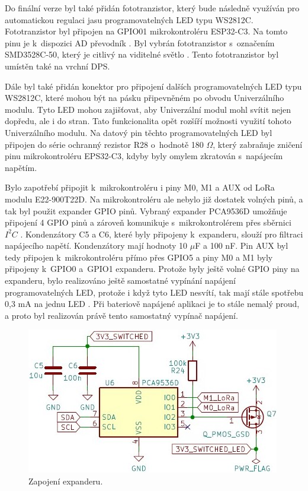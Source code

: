 Do finální verze byl také přidán fototranzistor, který bude následně využíván pro automatickou regulaci jasu programovatelných LED typu WS2812C. Fototranzistor byl připojen na GPIO01 mikrokontroléru ESP32-C3. Na tomto 
pinu je k~dispozici AD převodník \cite{ESP_C3_dtsh}. Byl vybrán fototranzistor s~označením SMD3528C-50, který je citlivý na viditelné světlo \cite{Phototransistor}.
Tento fototranzistor byl umístěn také na vrchní DPS. 

Dále byl také 
přidán konektor pro připojení dalších programovatelných LED typu WS2812C, které mohou být na pásku připevněném po obvodu Univerzálního modulu. Tyto LED mohou zajišťovat, aby Univerzální modul mohl svítit 
nejen dopředu, ale i do stran. Tato funkcionalita opět rozšíří možnosti využití tohoto Univerzálního modulu. Na datový pin těchto programovatelných LED byl připojen do série ochranný rezistor R28 o~hodnotě 
180 $\Omega$, který 
zabraňuje zničení pinu mikrokontroléru EPS32-C3, kdyby byly omylem zkratován s~napájecím napětím. 

Bylo zapotřebí připojit k~mikrokontroléru i piny M0, M1 a AUX od LoRa modulu E22-900T22D. Na mikrokontroléru ale nebylo již dostatek volných pinů, a tak byl použit expander GPIO pinů. Vybraný expander
PCA9536D umožňuje připojení 4 GPIO pinů a zároveň komunikuje s~mikrokontrolérem přes sběrnici $I^2C$ \cite{expander}. Kondenzátory C5 a C6, které byly připojeny k~expanderu, slouží pro filtraci napájecího napětí. 
Kondenzátory mají hodnoty 10 $\mu$F a 100 nF. Pin AUX byl tedy připojen k~mikrokontroléru přímo přes GPIO5 a piny M0 a M1 byly připojeny k~GPIO0 
a~GPIO1 expanderu. Protože byly ještě volné GPIO piny na expanderu, bylo realizováno ještě samostatné vypínání napájení programovatelných LED, protože i když tyto LED nesvítí, tak mají stále spotřebu 
0,3 mA na jednu LED \cite{WS2812C_dtsh}. Při bateriově napájené aplikaci je to stále nemalý proud, a proto byl realizován právě tento samostatný vypínač napájení. 

\begin{figure}[!h]
  \begin{center}
    \includegraphics[scale=0.8]{obrazky/expander.jpg}
  \end{center}
  \caption[Zapojení expanderu]{Zapojení expanderu.}
\end{figure}


